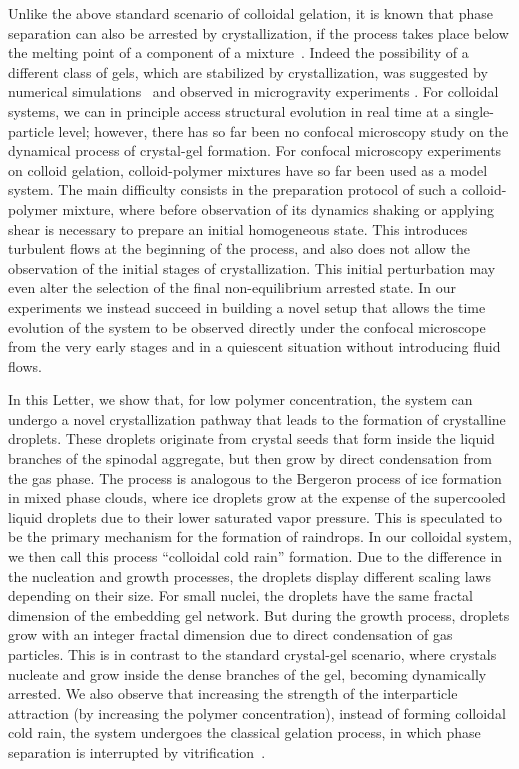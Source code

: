 \documentclass[12pt]{article}
\begin{document}
Unlike the above standard scenario of colloidal gelation, it is known that phase separation can also be arrested by crystallization, if the process takes place below the melting point of a component of a mixture~\cite{tanaka1985new}. 
Indeed the possibility of a different class of gels, which are stabilized by crystallization, 
was suggested by numerical simulations~\cite{fortini2008crystallization,perez2011pathways} and observed in microgravity experiments \cite{sabin2012}.
For colloidal systems, we can in principle access structural evolution in real time at a single-particle level; however, there has so far been no confocal microscopy  
study on the dynamical process of crystal-gel formation. 
For confocal microscopy experiments on colloid gelation, colloid-polymer mixtures have so far been used as a model system. 
The main difficulty consists in the preparation protocol of such a colloid-polymer mixture, where before observation of its dynamics shaking or applying shear is necessary to prepare an initial homogeneous state. This introduces turbulent flows at the beginning of the process, and also does not allow the
observation of the initial stages of crystallization. This initial perturbation may even alter the selection of the final non-equilibrium arrested state.  
In our experiments we instead succeed in building a novel setup that allows the time evolution of the system to be observed directly
under the confocal microscope from the very early stages and in a quiescent situation without introducing fluid flows.

In this Letter, we show that, for low polymer concentration, the system can undergo a novel crystallization pathway that leads to the formation
of crystalline droplets. These droplets originate from crystal seeds that form inside the liquid branches of the spinodal aggregate, but then grow by direct condensation from the gas phase. The process is analogous to the Bergeron process of ice formation in mixed phase clouds, where ice droplets grow at the
expense of the supercooled liquid droplets due to their lower saturated vapor pressure. 
This is speculated to be the primary mechanism for the formation of raindrops. 
In our colloidal system, we then call this process ``colloidal cold rain''
formation. Due to the difference in the nucleation and growth processes, the droplets display different scaling laws depending on their
size. For small nuclei, the droplets have the same fractal dimension of the embedding gel network. But during the growth process, droplets
grow with an integer fractal dimension due to direct condensation of gas particles. This is in contrast to the standard crystal-gel scenario, where crystals nucleate and grow inside the dense branches of the gel, becoming dynamically arrested. We also observe that increasing the strength of the interparticle attraction
(by increasing the polymer concentration), instead of forming colloidal cold rain, the system undergoes the classical gelation process, in which
phase separation is interrupted by vitrification~\cite{verhaegh1997transient,tanaka1999colloid,Royall2007,lu2008gelation}. 
\end{document}
